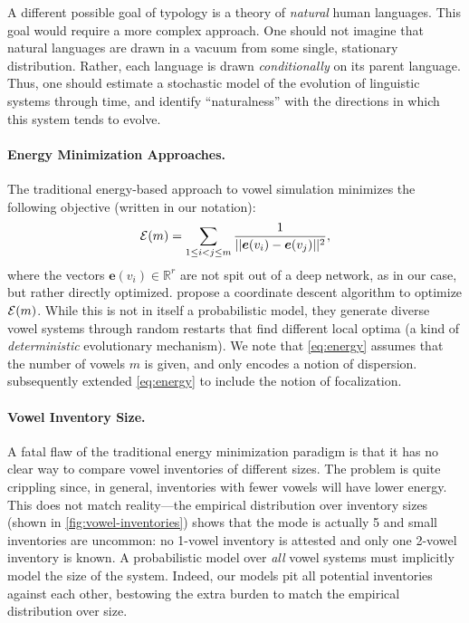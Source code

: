 \documentclass[11pt,a4paper]{article}
\renewcommand{\cite}[2][]{\citep[#1]{#2}}
\renewcommand{\newcite}[2][]{\citet[#1]{#2}}
\newcommand{\Real}{\mathbb{R}}
\newcommand{\e}{{\boldsymbol e}}
\newcommand{\eenergy}{\e}
\begin{document}
A different possible goal of typology is a theory of {\em natural} human languages.  This goal would require a more complex approach.  One should not imagine that natural languages are drawn in a vacuum from some single, stationary distribution.  Rather, each language is drawn {\em conditionally} on its parent language.  Thus, one should estimate a stochastic model of the evolution of linguistic systems through time, and identify ``naturalness'' with the directions in which this system tends to evolve.

\paragraph{Energy Minimization Approaches.}
The traditional energy-based approach \cite{liljencrants1972numerical} to vowel simulation
minimizes the following objective (written in our notation):
\begin{equation}
  {\cal E}(m) = \sum_{1 \leq i < j \leq m} \frac{1}{||\eenergy(v_i) - \eenergy(v_j)||^2},
  \label{eq:energy}
\end{equation}
where the vectors $\eenergy(v_i) \in \Real^r$ are not spit out of a deep network,
as in our case, but rather directly optimized.  
\newcite{liljencrants1972numerical} 
propose a coordinate descent algorithm to optimize ${\cal E}(m)$.  While this
is not in itself a probabilistic model, they generate diverse vowel systems through 
random restarts that find different local optima (a kind of {\em deterministic} evolutionary mechanism).  
We note that \cref{eq:energy} assumes that the number of vowels $m$ is given, 
and only encodes a notion of dispersion.  \newcite{roark2001explaining} subsequently extended \cref{eq:energy}
to include the notion of focalization. 

\paragraph{Vowel Inventory Size.}
A fatal flaw of the traditional energy minimization paradigm is that it has no clear way to
compare vowel inventories of different sizes. The problem is quite
crippling since, in general, inventories with fewer vowels will have
lower energy. This does not match reality---the empirical distribution
over inventory sizes (shown in \cref{fig:vowel-inventories}) shows that the mode is
actually 5 and small inventories are uncommon: no 1-vowel
inventory is attested and only one 2-vowel inventory is known.
A probabilistic model over {\em all} vowel systems must
implicitly model the size of the system. Indeed, our models pit all potential inventories against each
other, bestowing the extra burden to match the
empirical distribution over size.
\end{document}
